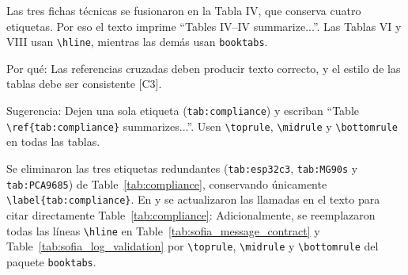 \documentclass{LabDSTresponse}
\begin{document}
\LabDSTsummary


{Las tres fichas técnicas se fusionaron en la Tabla IV, que conserva cuatro etiquetas. Por eso el texto imprime “Tables IV–IV summarize...”. Las Tablas VI y VIII usan \texttt{\textbackslash hline}, mientras las demás usan \texttt{booktabs}.

Por qué: Las referencias cruzadas deben producir texto correcto, y el estilo de las tablas debe ser consistente [C3].

Sugerencia: Dejen una sola etiqueta (\texttt{tab:compliance}) y escriban “Table \texttt{\textbackslash ref\{tab:compliance\}} summarizes...”. Usen \texttt{\textbackslash toprule}, \texttt{\textbackslash midrule} y \texttt{\textbackslash bottomrule} en todas las tablas.}
{Se eliminaron las tres etiquetas redundantes (\texttt{tab:esp32c3}, \texttt{tab:MG90s} y \texttt{tab:PCA9685}) de Table~\ref{tab:compliance}, conservando únicamente \texttt{\textbackslash label\{tab:compliance\}}. En  y  se actualizaron las llamadas en el texto para citar directamente Table~\ref{tab:compliance}:
Adicionalmente, se reemplazaron todas las líneas \texttt{\textbackslash hline} en Table~\ref{tab:sofia_message_contract} y Table~\ref{tab:sofia_log_validation} por \texttt{\textbackslash toprule}, \texttt{\textbackslash midrule} y \texttt{\textbackslash bottomrule} del paquete \texttt{booktabs}.}
\end{document}
